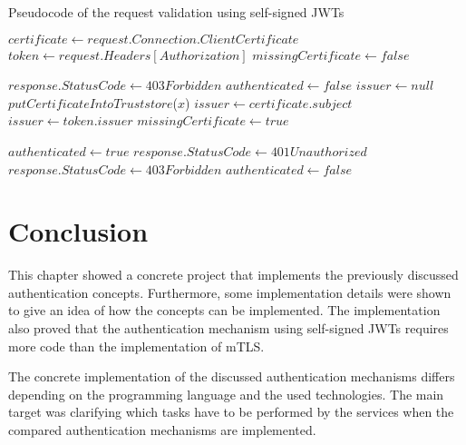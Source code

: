 \begin{algorithm}[H]
	\caption{Pseudocode of the request validation using self-signed JWTs}\label{alg:jwt}
	\begin{algorithmic}
		\State $certificate \gets request.Connection.ClientCertificate$
		\State $token \gets request.Headers[Authorization]$
		\State $missingCertificate \gets false$

		\State $response.StatusCode \gets 403Forbidden$
		\State $authenticated \gets false$
		\Else
		\State $issuer \gets null$
		\State $putCertificateIntoTruststore$($x$)
		\State $issuer \gets certificate.subject$
		\Else
		\State $issuer \gets token.issuer$
		\Else
		\State $missingCertificate \gets true$
		\EndIf
		\EndIf

		\State $authenticated \gets true$
		\Else
		\State $response.StatusCode \gets 401Unauthorized$
		\Else
		\State $response.StatusCode \gets 403Forbidden$
		\EndIf
		\State $authenticated \gets false$
		\EndIf
		\EndIf
	\end{algorithmic}
\end{algorithm}

\section{Conclusion}
This chapter showed a concrete project that implements the previously discussed authentication concepts.
Furthermore, some implementation details were shown to give an idea of how the concepts can be implemented.
The implementation also proved that the authentication mechanism using self-signed JWTs requires more code than the implementation of mTLS.

The concrete implementation of the discussed authentication mechanisms differs depending on the programming language and the used technologies.
The main target was clarifying which tasks have to be performed by the services when the compared authentication mechanisms are implemented.
